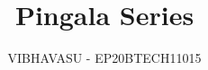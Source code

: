 \documentclass[journal,12pt,twocolumn]{IEEEtran}
\begin{document}
	\let\StandardTheFigure\thefigure
	\renewcommand{\thefigure}{\theproblem}
	
	
	
	\def\putbox#1#2#3{\makebox[0in][l]{\makebox[#1][l]{}\raisebox{\baselineskip}[0in][0in]{\raisebox{#2}[0in][0in]{#3}}}}
	\def\rightbox#1{\makebox[0in][r]{#1}}
	\def\centbox#1{\makebox[0in]{#1}}
	\def\topbox#1{\raisebox{-\baselineskip}[0in][0in]{#1}}
	\def\midbox#1{\raisebox{-0.5\baselineskip}[0in][0in]{#1}}
	
	\vspace{3cm}
	
	\title{ 
		Pingala Series
	}
	
	
	
	\author{ VIBHAVASU - EP20BTECH11015}
% 
%
\end{document}
